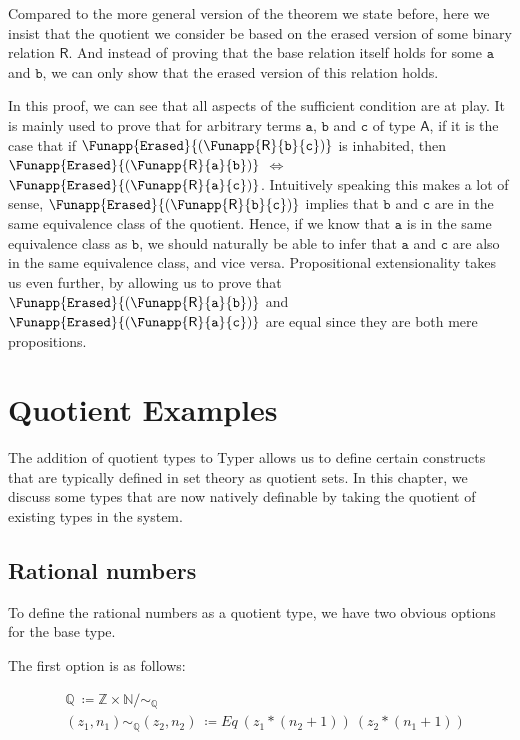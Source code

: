 \documentclass[12pt,twoside,maitrise]{dms}
\theoremstyle{definition}
\numberwithin{equation}{section}
\numberwithin{table}{chapter}
\numberwithin{figure}{chapter}
\newcommand\kw[1] {\textsf{#1}}
\newcommand\id[1] {\texttt{#1}}
\begin{document}
Compared to the more general version of the theorem we state before, here we insist that the quotient we consider be based on the erased version of some binary relation $\kw{R}$. And instead of proving that the base relation itself holds for some $\id{a}$ and $\id{b}$, we can only show that the erased version of this relation holds.

In this proof, we can see that all aspects of the sufficient condition are at
play. It is mainly used to prove that for arbitrary terms $\id{a}$, $\id{b}$ and
$\id{c}$ of type $\kw{A}$, if it is the case that if
$\Funapp{\id{Erased}}{(\Funapp{\kw{R}}{\id{b}}{\id{c}})}$ is inhabited, then
$\Funapp{\id{Erased}}{(\Funapp{\kw{R}}{\id{a}}{\id{b}})}$ $\iff$
$\Funapp{\id{Erased}}{(\Funapp{\kw{R}}{\id{a}}{\id{c}})}$. Intuitively speaking
this makes a lot of sense,
$\Funapp{\id{Erased}}{(\Funapp{\kw{R}}{\id{b}}{\id{c}})}$ implies that $\id{b}$
and $\id{c}$ are in the same equivalence class of the quotient. Hence, if we
know that $\id{a}$ is in the same equivalence class as $\id{b}$, we should
naturally be able to infer that $\id{a}$ and $\id{c}$ are also in the same
equivalence class, and vice versa. Propositional extensionality takes us even
further, by allowing us to prove that
$\Funapp{\id{Erased}}{(\Funapp{\kw{R}}{\id{a}}{\id{b}})}$ and
$\Funapp{\id{Erased}}{(\Funapp{\kw{R}}{\id{a}}{\id{c}})}$ are equal since they
are both mere propositions.

\chapter{Quotient Examples}\label{ch:quot-examples}
The addition of quotient types to Typer allows us to define certain constructs
that are typically defined in set theory as quotient sets. In this chapter, we
discuss some types that are now natively definable by taking the quotient of
existing types in the system.

\section{Rational numbers}
To define the rational numbers as a quotient type, we have two obvious options for the base type.

The first option is as follows:

\begin{align*}
  & \mathbb{Q} \ \coloneqq \mathbb{Z} \times \mathbb{N} / \sim_{\mathbb{Q}} \\
  & (z_1 , n_1) \sim_{\mathbb{Q}} (z_2 , n_2) \ \coloneqq Eq \ (z_1 * (n_2 + 1)) \ (z_2 * (n_1 + 1))
\end{align*}
\end{document}
